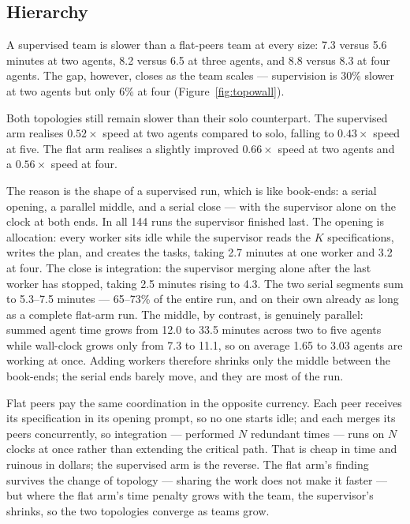 \documentclass[11pt,a4paper]{article}
\begin{document}
\subsection{Hierarchy}\label{sec:wallhier}

A supervised team is slower than a flat-peers team at every size: 7.3 versus 5.6 minutes at two agents, 8.2 versus 6.5 at three agents, and 8.8 versus 8.3 at four agents. The gap, however, closes as the team scales --- supervision is 30\% slower at two agents but only 6\% at four (Figure~\ref{fig:topowall}).

Both topologies still remain slower than their solo counterpart. The supervised arm realises $0.52\times$ speed at two agents compared to solo, falling to $0.43\times$ speed at five. The flat arm realises a slightly improved $0.66\times$ speed at two agents and a $0.56\times$ speed at four.

The reason is the shape of a supervised run, which is like book-ends: a serial opening, a parallel middle, and a serial close --- with the supervisor alone on the clock at both ends. In all 144 runs the supervisor finished last. The opening is allocation: every worker sits idle while the supervisor reads the $K$ specifications, writes the plan, and creates the tasks, taking 2.7 minutes at one worker and 3.2 at four. The close is integration: the supervisor merging alone after the last worker has stopped, taking 2.5 minutes rising to 4.3. The two serial segments sum to 5.3--7.5 minutes --- 65--73\% of the entire run, and on their own already as long as a complete flat-arm run. The middle, by contrast, is genuinely parallel: summed agent time grows from 12.0 to 33.5 minutes across two to five agents while wall-clock grows only from 7.3 to 11.1, so on average 1.65 to 3.03 agents are working at once. Adding workers therefore shrinks only the middle between the book-ends; the serial ends barely move, and they are most of the run.

Flat peers pay the same coordination in the opposite currency. Each peer receives its specification in its opening prompt, so no one starts idle; and each merges its peers concurrently, so integration --- performed $N$ redundant times --- runs on $N$ clocks at once rather than extending the critical path. That is cheap in time and ruinous in dollars; the supervised arm is the reverse. The flat arm's finding survives the change of topology --- sharing the work does not make it faster --- but where the flat arm's time penalty grows with the team, the supervisor's shrinks, so the two topologies converge as teams grow.
\end{document}
